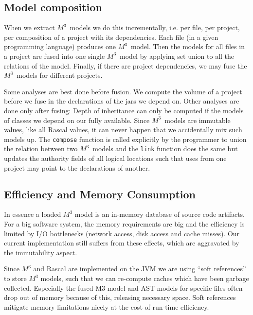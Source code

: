 \documentclass[conference]{IEEEtran}
\newcommand{\mthree}{\ensuremath{M^3}\xspace}
\begin{document}
\subsection{Model composition} When we extract \mthree\  models we do this
incrementally, i.e. per file, per project, per composition of a project with
its dependencies. Each file (in a given programming language) produces one
\mthree\  model. Then the models for all files in a project are fused into one
single \mthree\  model by applying set union to all the relations of the
model. Finally, if there are project dependencies, we may fuse the \mthree\
models for different projects.

Some analyses are best done before fusion. We compute the volume of a project
before we fuse in the declarations of the jars we depend on. Other analyses
are done only after fusing: Depth of inheritance can only be computed if the
models of classes we depend on our fully available. Since \mthree\  models are
immutable values, like all Rascal values, it can never happen that we
accidentally mix such models up. The \texttt{compose} function is called
explicitly by the programmer to union the relation between two \mthree\ models
and the \texttt{link} function does the same but updates the authority fields
of all logical locations such that uses from one project may point to the
declarations of another.


\subsection{Efficiency and Memory Consumption}

In essence a loaded \mthree model is an in-memory database of source code artifacts. For a big software system, the memory requirements are big and the efficiency is limited by I/O bottlenecks (network access, disk access and cache misses). Our current implementation still suffers from these effects, which are aggravated by the immutability aspect.

Since \mthree and Rascal are implemented on the JVM we are using ``soft references'' to store \mthree models, such that we can re-compute caches which have been garbage collected. Especially the fused M3 model and AST models for specific files often drop out of memory because of this, releasing necessary space. Soft references mitigate memory limitations nicely at the cost of run-time efficiency.
\end{document}
